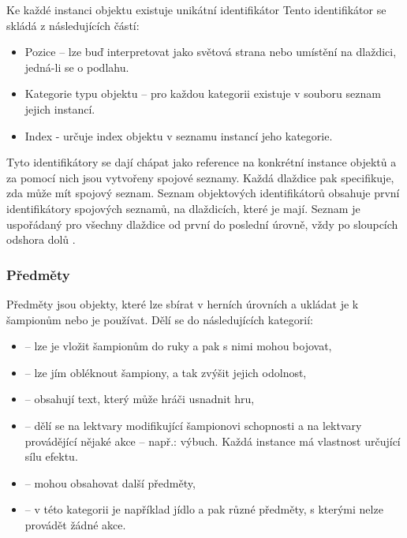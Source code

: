 Ke každé instanci objektu existuje unikátní identifikátor
Tento identifikátor se skládá z následujících částí:
\begin{itemize}
\item Pozice -- lze buď interpretovat jako světová strana nebo 
	umístění na dlaždici, jedná-li se o podlahu.
\item Kategorie typu objektu -- pro každou kategorii existuje
	v souboru  seznam jejich instancí.
\item Index - určuje index objektu v seznamu instancí jeho kategorie.
\end{itemize}

Tyto identifikátory se dají chápat jako reference na konkrétní instance objektů  a
za pomocí nich jsou vytvořeny spojové seznamy. Každá dlaždice pak specifikuje, zda může mít spojový seznam.
Seznam objektových identifikátorů obsahuje první identifikátory spojových seznamů, na dlaždicích, které 
je mají. Seznam je uspořádaný pro všechny dlaždice od první do poslední úrovně, vždy po sloupcích odshora dolů .


\subsubsection{Předměty}\label{grabable-items}

Předměty jsou objekty, které lze sbírat v herních úrovních a ukládat je k šampionům nebo je používat.
Dělí se do následujících kategorií:
\begin{itemize}
\item {} -- lze je vložit šampionům do ruky a pak s nimi mohou bojovat,
\item {} -- lze jím obléknout šampiony, a tak zvýšit jejich odolnost,
\item {} -- obsahují text, který může hráči usnadnit hru, 
\item {} -- dělí se na lektvary modifikující šampionovi schopnosti a na lektvary provádějící nějaké
	akce -- např.: výbuch. Každá instance má vlastnost určující sílu efektu.
\item {} -- mohou obsahovat další předměty,
\item {} -- v této kategorii je například jídlo a pak různé předměty, s kterými nelze provádět žádné akce.
\end{itemize}

